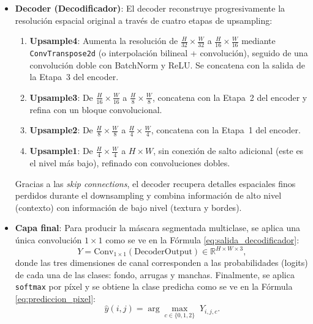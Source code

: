 \begin{enumerate}
\begin{itemize}
\begin{itemize}
  \item \textbf{Decoder (Decodificador)}:  
    El decoder reconstruye progresivamente la resolución espacial original a través de cuatro etapas de upsampling:
    \begin{enumerate}
      \item \textbf{Upsample4}: Aumenta la resolución de $\frac{H}{32}\times\frac{W}{32}$ a $\frac{H}{16}\times\frac{W}{16}$ mediante \texttt{ConvTranspose2d} (o interpolación bilineal + convolución), seguido de una convolución doble con BatchNorm y ReLU. Se concatena con la salida de la Etapa 3 del encoder.
      \item \textbf{Upsample3}: De $\frac{H}{16}\times\frac{W}{16}$ a $\frac{H}{8}\times\frac{W}{8}$, concatena con la Etapa 2 del encoder y refina con un bloque convolucional.
      \item \textbf{Upsample2}: De $\frac{H}{8}\times\frac{W}{8}$ a $\frac{H}{4}\times\frac{W}{4}$, concatena con la Etapa 1 del encoder.
      \item \textbf{Upsample1}: De $\frac{H}{4}\times\frac{W}{4}$ a $H\times W$, sin conexión de salto adicional (este es el nivel más bajo), refinado con convoluciones dobles.
    \end{enumerate}
    Gracias a las \textit{skip connections}, el decoder recupera detalles espaciales finos perdidos durante el downsampling y combina información de alto nivel (contexto) con información de bajo nivel (textura y bordes).

  \item \textbf{Capa final}:  
    Para producir la máscara segmentada multiclase, se aplica una única convolución $1\times1$ como se ve en la Fórmula \ref{eq:salida_decodificador}:
    \begin{equation}\label{eq:salida_decodificador}
      Y = \mathrm{Conv}_{1\times1}(\text{DecoderOutput}) \in \mathbb{R}^{H\times W\times 3},
  \end{equation}
    donde las tres dimensiones de canal corresponden a las probabilidades (logits) de cada una de las clases: fondo, arrugas y manchas. Finalmente, se aplica \texttt{softmax} por píxel y se obtiene la clase predicha como se ve en la Fórmula \ref{eq:prediccion_pixel}:
    \begin{equation}\label{eq:prediccion_pixel}
      \hat{y}(i,j) = \arg\max_{c\in\{0,1,2\}} \;Y_{i,j,c}.
  \end{equation}
\end{itemize}


\end{itemize}
\end{enumerate}
